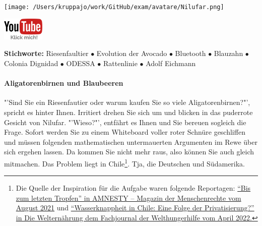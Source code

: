 \documentclass[a4paper, 9pt]{scrartcl}\usepackage[]{graphicx}\usepackage[]{xcolor}
\begin{document}
 
\ifcollection
\begin{flushright}
\tiny\vspace{-3Ex}
\textbf{\examinhaltstart}
\exammodulemathstat
\vspace{-4Ex}
\end{flushright}
\begin{minipage}[t]{0.5\textwidth}
\texttt{[image: /Users/kruppajo/work/GitHub/exam/avatare/Nilufar.png]}
\end{minipage}
\begin{minipage}[t]{0.5\textwidth}
\hfill
\href{https://youtu.be/https://youtu.be/k2G52hMIfqk}{\includegraphics[width = 2cm]{img/youtube}}
\end{minipage}
\fi

{\tiny\textbf{Stichworte:} Riesenfaultier $\bullet$ Evolution der Avocado $\bullet$ Bluetooth $ \bullet$ Blauzahn $\bullet$ Colonia Dignidad $\bullet$ ODESSA $\bullet$ Rattenlinie $\bullet$ Adolf Eichmann}



\ifcollection
\paragraph{Aligatorenbirnen und Blaubeeren}
\fi



"'Sind Sie ein Riesenfautier oder warum kaufen Sie so viele Aligatorenbirnen?"', spricht es hinter Ihnen. Irritiert drehen Sie sich um und blicken in das puderrote Gesicht von Nilufar. "'Wieso?"', entfährt es Ihnen und Sie bereuen sogleich die Frage. Sofort werden Sie zu einem Whiteboard voller roter Schnüre geschliffen und müssen folgenden mathematischen untermauerten Argumenten im Rewe über sich ergehen lassen. Da kommen Sie nicht mehr raus, also können Sie auch gleich mitmachen. Das Problem liegt in Chile\footnote{Die Quelle der Inspiration für die Aufgabe waren folgende Reportagen: \href{https://www.amnesty.ch/de/ueber-amnesty/publikationen/magazin-amnesty/2021-3/bis-zum-letzten-tropfen}{"`Bis zum letzten Tropfen"' in AMNESTY – Magazin der Menschenrechte vom August 2021} und \href{https://www.welthungerhilfe.de/welternaehrung/rubriken/klima-ressourcen/wassernot-in-chile-eine-folge-der-privatisierung}{"`Wasserknappheit in Chile: Eine Folge der Privatisierung?"' in Die Welternährung dem Fachjournal der Welthungerhilfe vom April 2022.}}. Tja, die Deutschen und Südamerika.\\
\end{document}
